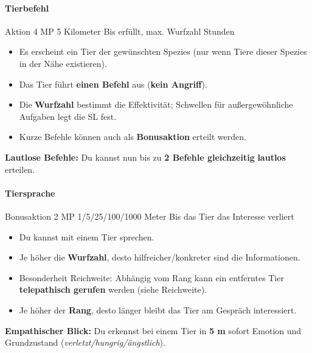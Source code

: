 \paragraph*{Tierbefehl}
\spellcard
{}
{Aktion}
{4 MP}
{5 Kilometer}
{Bis erfüllt, max. Wurfzahl Stunden}
{
	\begin{itemize}
		\item Es erscheint ein Tier der gewünschten Spezies (nur wenn Tiere dieser Spezies in der Nähe existieren).
		\item Das Tier führt \textbf{einen Befehl} aus (\textbf{kein Angriff}).
		\item Die \textbf{Wurfzahl} bestimmt die Effektivität; Schwellen für außergewöhnliche Aufgaben legt die SL fest.
		\item Kurze Befehle können auch als \textbf{Bonusaktion} erteilt werden.
	\end{itemize}
}
{
	\textbf{Lautlose Befehle:} Du kannst nun bis zu \textbf{2 Befehle gleichzeitig} \textbf{lautlos} erteilen.
}

\paragraph*{Tiersprache}
\spellcard
{}
{Bonusaktion}
{2 MP}
{1/5/25/100/1000 Meter}
{Bis das Tier das Interesse verliert}
{
	\begin{itemize}
		\item Du kannst mit einem Tier sprechen.
		\item Je höher die \textbf{Wurfzahl}, desto hilfreicher/konkreter sind die Informationen.
		\item Besonderheit Reichweite: Abhängig vom Rang kann ein entferntes Tier \textbf{telepathisch gerufen} werden (siehe Reichweite).
		\item Je höher der \textbf{Rang}, desto länger bleibt das Tier am Gespräch interessiert.
	\end{itemize}
}
{
	\textbf{Empathischer Blick:} Du erkennst bei einem Tier in \textbf{5 m} sofort Emotion und Grundzustand
	(\textit{verletzt/hungrig/ängstlich}).
}

